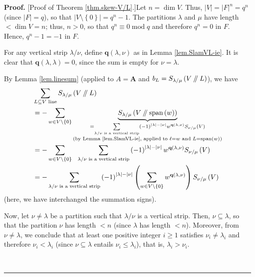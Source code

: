 \documentclass[numbers=enddot,12pt,final,onecolumn,notitlepage]{scrartcl}%
\numberwithin{exer}{section}
\theoremstyle{definition}
\newenvironment{proof}[1][Proof]{\noindent\textbf{#1.} }{\ \rule{0.5em}{0.5em}}
\let\sumnonlimits\sum
\renewcommand{\sum}{\sumnonlimits\limits}
\newcommand{\sslash}{\mathbin{/\mkern-5mu/}}
\theoremstyle{plainsl}
\begin{document}
\begin{proof}
[Proof of Theorem \ref{thm.skew-V/L}.]Let $n=\dim V$. Thus, $\left\vert
V\right\vert =\left\vert F\right\vert ^{n}=q^{n}$ (since $\left\vert
F\right\vert =q$), so that $\left\vert V\setminus\left\{  0\right\}
\right\vert =q^{n}-1$. The partitions $\lambda$ and $\mu$ have length $<\dim
V=n$; thus, $n>0$, so that $q^{n}\equiv0\operatorname{mod}q$ and therefore
$q^{n}=0$ in $F$. Hence, $q^{n}-1=-1$ in $F$.

For any vertical strip $\lambda/\nu$, define $\mathbf{q}\left(  \lambda
,\nu\right)  $ as in Lemma \ref{lem.SlamVL-ie}. It is clear that
$\mathbf{q}\left(  \lambda,\lambda\right)  =0$, since the sum is empty for
$\nu=\lambda$.

By Lemma \ref{lem.linesum} (applied to $A=\mathbf{A}$ and $b_{L}%
=S_{\lambda/\mu}\left(  V\sslash L\right)  $), we have
\begin{align}
&  \sum_{L\subseteq V\text{ line}}S_{\lambda/\mu}\left(  V\sslash L\right)
\nonumber\\
&  =-\sum_{w\in V\setminus\left\{  0\right\}  }\underbrace{S_{\lambda/\mu
}\left(  V\sslash \operatorname*{span}\left(  w\right)  \right)
}_{\substack{=\sum_{\lambda/\nu\text{ is a vertical strip}}\left(  -1\right)
^{\left\vert \lambda\right\vert -\left\vert \nu\right\vert }w^{\mathbf{q}%
\left(  \lambda,\nu\right)  }S_{\nu/\mu}\left(  V\right)  \\\text{(by Lemma
\ref{lem.SlamVL-ie}, applied to }\ell=w\text{ and }L=\operatorname*{span}%
\left(  w\right)  \text{)}}}\nonumber\\
&  =-\sum_{w\in V\setminus\left\{  0\right\}  }\ \ \sum_{\lambda/\nu\text{ is
a vertical strip}}\left(  -1\right)  ^{\left\vert \lambda\right\vert
-\left\vert \nu\right\vert }w^{\mathbf{q}\left(  \lambda,\nu\right)  }%
S_{\nu/\mu}\left(  V\right) \nonumber\\
&  =-\sum_{\lambda/\nu\text{ is a vertical strip}}\left(  -1\right)
^{\left\vert \lambda\right\vert -\left\vert \nu\right\vert }\left(  \sum_{w\in
V\setminus\left\{  0\right\}  }w^{\mathbf{q}\left(  \lambda,\nu\right)
}\right)  S_{\nu/\mu}\left(  V\right)  \label{pf.thm.skew-V/L.2}%
\end{align}
(here, we have interchanged the summation signs).

Now, let $\nu\neq\lambda$ be a partition such that $\lambda/\nu$ is a vertical
strip. Then, $\nu\subseteq\lambda$, so that the partition $\nu$ has length
$<n$ (since $\lambda$ has length $<n$). Moreover, from $\nu\neq\lambda$, we
conclude that at least one positive integer $i\geq1$ satisfies $\nu_{i}%
\neq\lambda_{i}$ and therefore $\nu_{i}<\lambda_{i}$ (since $\nu
\subseteq\lambda$ entails $\nu_{i}\leq\lambda_{i}$), that is, $\lambda_{i}%
>\nu_{i}$.


\end{proof}
\end{document}
